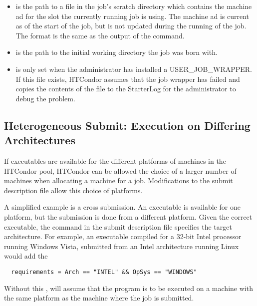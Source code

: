 \begin{itemize}
\item {}
is the path to a file in the job's scratch directory which contains
the machine ad for the slot the currently running job is using.  
The machine ad is current as of the start of the job, but is not updated during the running
of the job.  The format is the same as the output of the
   command.

\item {}
is the path to the initial working directory the job was born with.

\item {}
is only set when the administrator has installed a USER\_JOB\_WRAPPER.
If this file exists, HTCondor assumes that the job wrapper has failed
and copies the contents of the file to the StarterLog for the administrator
to debug the problem.

\end{itemize}



\subsection{Heterogeneous Submit: Execution on Differing Architectures} 

If executables are available for the different platforms of machines
in the HTCondor pool,
HTCondor can be allowed the choice of a larger number of machines
when allocating a machine for a job.
Modifications to the submit description file allow this choice
of platforms.

A simplified example is a cross submission.
An executable is available for one platform, but
the submission is done from a different platform.
Given the correct executable, the  command in
the submit description file specifies the target architecture.
For example, an executable compiled for a 32-bit Intel processor
running  Windows Vista, submitted
from an Intel architecture running Linux would add the 
\begin{verbatim}
  requirements = Arch == "INTEL" && OpSys == "WINDOWS"
\end{verbatim}
Without this , 
will assume that the program is to be executed on
a machine with the same platform as the machine where the job
is submitted.

